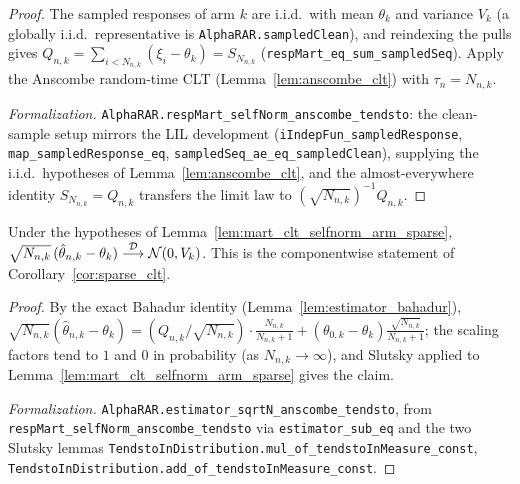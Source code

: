 \begin{proof}\leanok
{}
The sampled responses of arm $k$ are i.i.d.\ with mean $\theta_k$ and variance $V_k$
(a globally i.i.d.\ representative is \texttt{AlphaRAR.sampledClean}), and reindexing the pulls gives
$Q_{n,k}=\sum_{i<N_{n,k}}(\xi_i-\theta_k)=S_{N_{n,k}}$ (\texttt{respMart\_eq\_sum\_sampledSeq}). Apply
the Anscombe random-time CLT (Lemma~\ref{lem:anscombe_clt}) with $\tau_n=N_{n,k}$.

\emph{Formalization.} \texttt{AlphaRAR.respMart\_selfNorm\_anscombe\_tendsto}: the clean-sample setup
mirrors the LIL development (\texttt{iIndepFun\_sampledResponse}, \texttt{map\_sampledResponse\_eq},
\texttt{sampledSeq\_ae\_eq\_sampledClean}), supplying the i.i.d.\ hypotheses of
Lemma~\ref{lem:anscombe_clt}, and the almost-everywhere identity
$S_{N_{n,k}}=Q_{n,k}$ transfers the limit law to $(\sqrt{N_{n,k}})^{-1}Q_{n,k}$.
\end{proof}

\begin{lemma}\label{lem:clt_theta_arm_sparse}
\leanok
{}
Under the hypotheses of Lemma~\ref{lem:mart_clt_selfnorm_arm_sparse},
$\sqrt{N_{n,k}}\,(\hat\theta_{n,k}-\theta_k)\overset{\mathcal{D}}{\longrightarrow}\mathcal N(0,V_k)$. This is the componentwise
statement of Corollary~\ref{cor:sparse_clt}.
\end{lemma}

\begin{proof}\leanok
{}
By the exact Bahadur identity (Lemma~\ref{lem:estimator_bahadur}),
$\sqrt{N_{n,k}}(\hat\theta_{n,k}-\theta_k)=(Q_{n,k}/\sqrt{N_{n,k}})\cdot\frac{N_{n,k}}{N_{n,k}+1}
 + (\theta_{0,k}-\theta_k)\frac{\sqrt{N_{n,k}}}{N_{n,k}+1}$; the scaling factors tend to $1$ and $0$
in probability (as $N_{n,k}\to\infty$), and Slutsky applied to
Lemma~\ref{lem:mart_clt_selfnorm_arm_sparse} gives the claim.

\emph{Formalization.} \texttt{AlphaRAR.estimator\_sqrtN\_anscombe\_tendsto}, from
\texttt{respMart\_selfNorm\_anscombe\_tendsto} via \texttt{estimator\_sub\_eq} and the two Slutsky
lemmas \texttt{TendstoInDistribution.mul\_of\_tendstoInMeasure\_const},
\texttt{TendstoInDistribution.add\_of\_tendstoInMeasure\_const}.
\end{proof}
